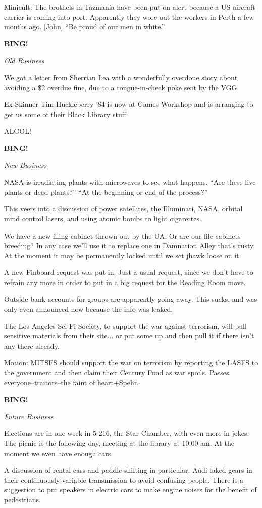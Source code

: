 \documentclass[12pt]{article}
\newcommand{\bing}{{\bf BING!} }
\newcommand{\goto}[1]{\bing \vskip 12pt \centerline{{\em{#1}}}}
\begin{document}
Minicult: The brothels in Tazmania have been put on alert because a US
aircraft carrier is coming into port.  Apparently they wore out the workers
in Perth a few months ago.  [John] ``Be proud of our men in white.''

\goto{Old Business}

We got a letter from Sherrian Lea with a wonderfully overdone story about
avoiding a \$2 overdue fine, due to a tongue-in-cheek poke sent by the VGG.

Ex-Skinner Tim Huckleberry '84 is now at Games Workshop and is arranging to
get us some of their Black Library stuff.

ALGOL!

\goto{New Business}

NASA is irradiating plants with microwaves to see what happens.  ``Are these
live plants or dead plants?''  ``At the beginning or end of the process?''

This veers into a discussion of power satellites, the Illuminati, NASA,
orbital mind control lasers, and using atomic bombs to light cigarettes.

We have a new filing cabinet thrown out by the UA.  Or are our file
cabinets breeding?  In any case we'll use it to replace one in Damnation
Alley that's rusty.  At the moment it may be permanently locked until we
set jhawk loose on it.

A new Finboard request was put in.  Just a usual request, since we don't
have to refrain any more in order to put in a big request for the Reading
Room move.

Outside bank accounts for groups are apparently going away.  This sucks,
and was only even announced now because the info was leaked.

The Los Angeles Sci-Fi Society, to support the war against terrorism,
will pull sensitive materials from their site... or put some up and then
pull it if there isn't any there already.

Motion: MITSFS should support the war on terrorism by reporting the
LASFS to the government and then claim their Century Fund as war spoils.
Passes everyone--traitors--the faint of heart+Spehn.

\goto{Future Business}

Elections are in one week in 5-216, the Star Chamber, with even more
in-jokes.  The picnic is the following day, meeting at the library at
10:00 am.  At the moment we even have enough cars.

A discussion of rental cars and paddle-shifting in particular.  Audi
faked gears in their continuously-variable transmission to avoid
confusing people.  There is a suggestion to put speakers in electric
cars to make engine noises for the benefit of pedestrians.
\end{document}
